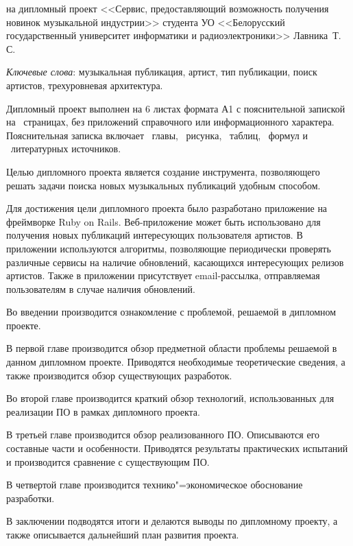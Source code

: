 \thispagestyle{empty}

\begin{center}
  \begin{minipage}{0.82\textwidth}
    на дипломный проект <<Сервис, предоставляющий возможность получения новинок музыкальной индустрии>> студента УО <<Белорусский государственный университет информатики и радиоэлектроники>> Лавника~Т.\,С.
  \end{minipage}
\end{center}

\emph{Ключевые слова}: музыкальная публикация, артист, тип публикации, поиск артистов, трехуровневая архитектура.

\vspace{4\parsep}

Дипломный проект выполнен на 6 листах формата А1 с пояснительной запиской на~\pageref*{LastPage} страницах, без приложений справочного или информационного характера.
Пояснительная записка включает ~главы, \totfig{}~рисунка, \tottab{}~таблиц, \toteq{}~формул и \totref{}~литературных источников.

Целью дипломного проекта является создание инструмента, позволяющего решать задачи поиска новых музыкальных публикаций удобным способом.

Для достижения цели дипломного проекта было разработано приложение на фреймворке Ruby on Rails.
Веб-приложение может быть использовано для получения новых публикаций интересующих пользователя артистов.
В приложении используются алгоритмы, позволяющие периодически проверять различные сервисы на наличие обновлений, касающихся интересующих релизов артистов. Также в приложении присутствует email-рассылка, отправляемая пользователям в случае наличия обновлений.

Во введении производится ознакомление с проблемой, решаемой в дипломном проекте.

В первой главе производится обзор предметной области проблемы решаемой в данном дипломном проекте.
Приводятся необходимые теоретические сведения, а также производится обзор существующих разработок.

Во второй главе производится краткий обзор технологий, использованных для реализации ПО в рамках дипломного проекта.

В третьей главе производится обзор реализованного ПО.
Описываются его составные части и особенности.
Приводятся результаты практических испытаний и производится сравнение с существующим ПО.

В четвертой главе производится технико"=экономическое обоснование разработки.

В заключении подводятся итоги и делаются выводы по дипломному проекту, а также описывается дальнейший план развития проекта.

\clearpage
